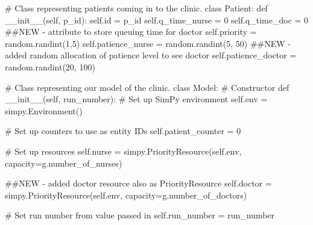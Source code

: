 \documentclass[
  letterpaper,
  DIV=11,
  numbers=noendperiod]{scrreprt}
\newenvironment{Shaded}{}{}
\newcommand{\BuiltInTok}[1]{\textcolor[rgb]{0.84,0.23,0.29}{#1}}
\newcommand{\CommentTok}[1]{\textcolor[rgb]{0.42,0.45,0.49}{#1}}
\newcommand{\DecValTok}[1]{\textcolor[rgb]{0.00,0.36,0.77}{#1}}
\newcommand{\FunctionTok}[1]{\textcolor[rgb]{0.44,0.26,0.76}{#1}}
\newcommand{\KeywordTok}[1]{\textcolor[rgb]{0.84,0.23,0.29}{#1}}
\newcommand{\NormalTok}[1]{\textcolor[rgb]{0.14,0.16,0.18}{#1}}
\newcommand{\OperatorTok}[1]{\textcolor[rgb]{0.14,0.16,0.18}{#1}}
\newcommand{\VariableTok}[1]{\textcolor[rgb]{0.89,0.38,0.04}{#1}}
\begin{document}
\begin{tcolorbox}
\begin{Shaded}
\begin{Highlighting}[]
\CommentTok{\# Class representing patients coming in to the clinic.}
\KeywordTok{class}\NormalTok{ Patient:}
    \KeywordTok{def} \FunctionTok{\_\_init\_\_}\NormalTok{(}\VariableTok{self}\NormalTok{, p\_id):}
        \VariableTok{self}\NormalTok{.}\BuiltInTok{id} \OperatorTok{=}\NormalTok{ p\_id}
        \VariableTok{self}\NormalTok{.q\_time\_nurse }\OperatorTok{=} \DecValTok{0}
        \VariableTok{self}\NormalTok{.q\_time\_doc }\OperatorTok{=} \DecValTok{0} \CommentTok{\#\#NEW {-} attribute to store queuing time for doctor}
        \VariableTok{self}\NormalTok{.priority }\OperatorTok{=}\NormalTok{ random.randint(}\DecValTok{1}\NormalTok{,}\DecValTok{5}\NormalTok{)}
        \VariableTok{self}\NormalTok{.patience\_nurse }\OperatorTok{=}\NormalTok{ random.randint(}\DecValTok{5}\NormalTok{, }\DecValTok{50}\NormalTok{)}
        \CommentTok{\#\#NEW {-} added random allocation of patience level to see doctor}
        \VariableTok{self}\NormalTok{.patience\_doctor }\OperatorTok{=}\NormalTok{ random.randint(}\DecValTok{20}\NormalTok{, }\DecValTok{100}\NormalTok{)}

\CommentTok{\# Class representing our model of the clinic.}
\KeywordTok{class}\NormalTok{ Model:}
    \CommentTok{\# Constructor}
    \KeywordTok{def} \FunctionTok{\_\_init\_\_}\NormalTok{(}\VariableTok{self}\NormalTok{, run\_number):}
        \CommentTok{\# Set up SimPy environment}
        \VariableTok{self}\NormalTok{.env }\OperatorTok{=}\NormalTok{ simpy.Environment()}

        \CommentTok{\# Set up counters to use as entity IDs}
        \VariableTok{self}\NormalTok{.patient\_counter }\OperatorTok{=} \DecValTok{0}

        \CommentTok{\# Set up resources}
        \VariableTok{self}\NormalTok{.nurse }\OperatorTok{=}\NormalTok{ simpy.PriorityResource(}\VariableTok{self}\NormalTok{.env,}
\NormalTok{                                            capacity}\OperatorTok{=}\NormalTok{g.number\_of\_nurses)}

        \CommentTok{\#\#NEW {-} added doctor resource also as PriorityResource}
        \VariableTok{self}\NormalTok{.doctor }\OperatorTok{=}\NormalTok{ simpy.PriorityResource(}\VariableTok{self}\NormalTok{.env,}
\NormalTok{                                             capacity}\OperatorTok{=}\NormalTok{g.number\_of\_doctors)}

        \CommentTok{\# Set run number from value passed in}
        \VariableTok{self}\NormalTok{.run\_number }\OperatorTok{=}\NormalTok{ run\_number}


\end{Highlighting}
\end{Shaded}
\end{tcolorbox}
\end{document}

